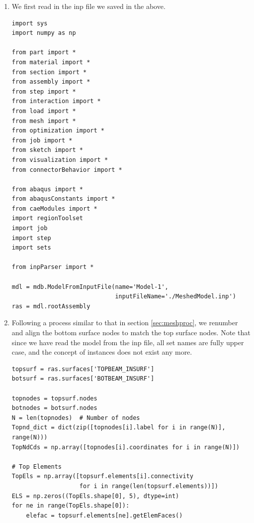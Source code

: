 \documentclass[11pt]{article}
\begin{document}
\begin{enumerate}
\item We first read in the inp file we saved in the above.
\begin{verbatim}
import sys
import numpy as np

from part import *
from material import *
from section import *
from assembly import *
from step import *
from interaction import *
from load import *
from mesh import *
from optimization import *
from job import *
from sketch import *
from visualization import *
from connectorBehavior import *

from abaqus import *
from abaqusConstants import *
from caeModules import * 
import regionToolset
import job
import step
import sets

from inpParser import *

mdl = mdb.ModelFromInputFile(name='Model-1',
                             inputFileName='./MeshedModel.inp')
ras = mdl.rootAssembly
\end{verbatim}
\item Following a process similar to that in section \ref{sec:meshproc}, we renumber and align the bottom surface nodes to match the top surface nodes.
Note that since we have read the model from the inp file, all set names are fully upper case, and the concept of instances does not exist any more.
\begin{verbatim}
topsurf = ras.surfaces['TOPBEAM_INSURF']
botsurf = ras.surfaces['BOTBEAM_INSURF']

topnodes = topsurf.nodes
botnodes = botsurf.nodes
N = len(topnodes)  # Number of nodes
Topnd_dict = dict(zip([topnodes[i].label for i in range(N)], range(N)))
TopNdCds = np.array([topnodes[i].coordinates for i in range(N)])

# Top Elements
TopEls = np.array([topsurf.elements[i].connectivity
                   for i in range(len(topsurf.elements))])
ELS = np.zeros((TopEls.shape[0], 5), dtype=int)
for ne in range(TopEls.shape[0]):
    elefac = topsurf.elements[ne].getElemFaces()


\end{verbatim}
\end{enumerate}
\end{document}
